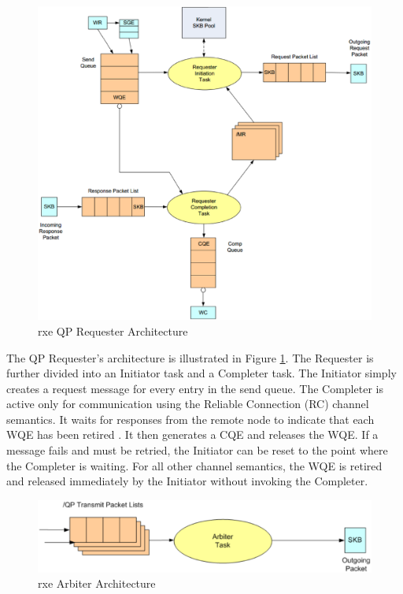 \documentclass[11pt]{book}
\begin{document}
\begin{figure}
\includegraphics[width=\textwidth]{rxe_req}
\caption{rxe QP Requester Architecture \protect\cite{pearson-10}}\label{rxe-req} 
\end{figure}

The QP Requester's architecture is illustrated in Figure \ref{rxe-req}.  The Requester is
further divided into an Initiator task and a Completer task.  The Initiator simply creates
a request message for every entry in the send queue.  The Completer is active only for
communication using the Reliable Connection (RC) channel semantics.  It waits for
responses from the remote node to indicate that each WQE has been retired
\cite{pearson-10}. It then generates a CQE and releases the WQE. If a message fails and
must be retried, the Initiator can be reset to the point where the Completer is waiting.
For all other channel semantics, the WQE is retired and released immediately by the
Initiator without invoking the Completer.

\begin{figure}
\includegraphics[width=\textwidth]{rxe_arbiter}
\caption{rxe Arbiter Architecture \protect\cite{pearson-10}}\label{rxe-arbiter}
\end{figure}
\end{document}
